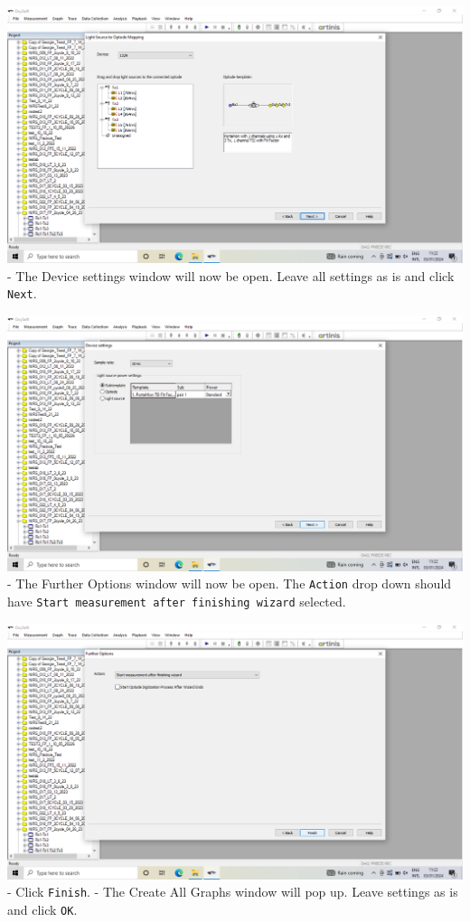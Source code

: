 \documentclass[
]{book}
\begin{document}
\includegraphics[width=1\linewidth]{images/startnewmeasurement/13_optodemapping_popup}
- The Device settings window will now be open. Leave all settings as is and click \texttt{Next}.

\includegraphics[width=1\linewidth]{images/startnewmeasurement/14_device_settings_popup}
- The Further Options window will now be open. The \texttt{Action} drop down should have \texttt{Start\ measurement\ after\ finishing\ wizard} selected.

\includegraphics[width=1\linewidth]{images/startnewmeasurement/15_furtheroptions_popup}
- Click \texttt{Finish}.
- The Create All Graphs window will pop up. Leave settings as is and click \texttt{OK}.
\end{document}
